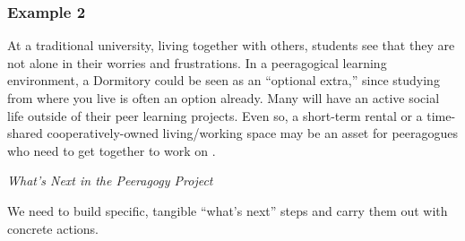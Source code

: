 \subsubsection*{Example 2}
At a traditional university,  living together with others, students see that they are not alone in their worries and frustrations. In a peeragogical learning environment, a Dormitory could be seen as an ``optional extra,'' since studying
from where you live is often an option already. Many will have an active social life outside of their peer learning projects.  Even so, a short-term rental or a time-shared cooperatively-owned living/working space may be an asset for peeragogues who need to get together to work on .


\begin{framed}
\noindent 
\emph{What's Next in the Peeragogy Project}
\begin{collectinmacro}{\SpecificWN}{}{}
We need to build specific, tangible ``what's next'' steps and carry them out with concrete actions. 
\end{collectinmacro}
\SpecificWN
\end{framed}

